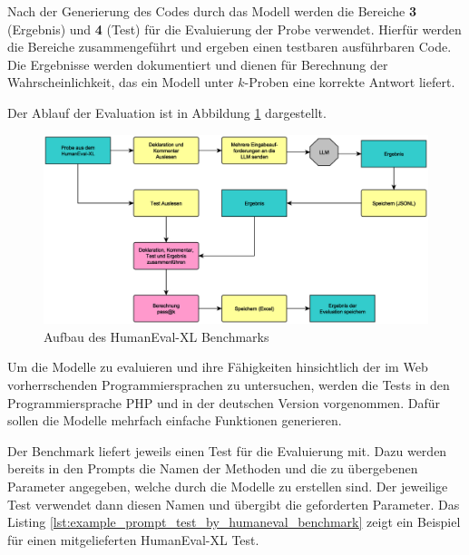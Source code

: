 Nach der Generierung des Codes durch das Modell werden die Bereiche \textbf{3} (Ergebnis) und \textbf{4} (Test) für die Evaluierung der Probe verwendet. Hierfür werden die Bereiche zusammengeführt und ergeben einen testbaren ausführbaren Code. Die Ergebnisse werden dokumentiert und dienen für Berechnung der Wahrscheinlichkeit, das ein Modell unter $k$-Proben eine korrekte Antwort liefert.\vspace{0.2cm}

Der Ablauf der Evaluation ist in Abbildung \ref{img:sequence_of_evaluation} dargestellt.\vspace{0.2cm}

\begin{figure}[!ht]
	\includegraphics[width=\textwidth]{content/chapter_concept_design/images/ablauf_evaluation.eps}
	\centering
	\caption{Aufbau des HumanEval-XL Benchmarks}
	\label{img:sequence_of_evaluation}
\end{figure}


Um die Modelle zu evaluieren und ihre Fähigkeiten hinsichtlich der im Web vorherrschenden Programmiersprachen zu untersuchen, werden die Tests in den Programmiersprache PHP und in der deutschen Version vorgenommen. Dafür sollen die Modelle mehrfach einfache Funktionen generieren.\vspace{0.2cm}

Der Benchmark liefert jeweils einen Test für die Evaluierung mit. Dazu werden bereits in den Prompts die Namen der Methoden und die zu übergebenen Parameter angegeben, welche durch die Modelle zu erstellen sind. Der jeweilige Test verwendet dann diesen Namen und übergibt die geforderten Parameter. Das Listing \ref{lst:example_prompt_test_by_humaneval_benchmark} zeigt ein Beispiel für einen mitgelieferten HumanEval-XL Test.\vspace{0.2cm}

